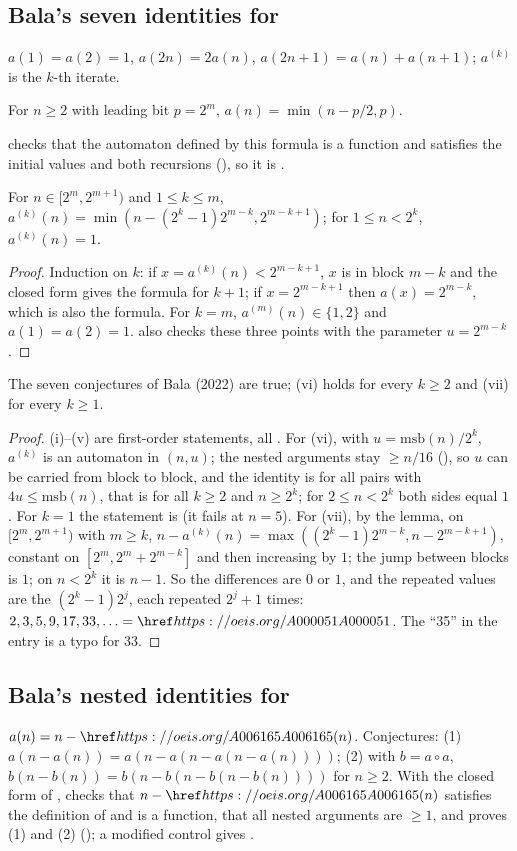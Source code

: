 \subsection{Bala's seven identities for }\label{s:A006165}
$a(1)=a(2)=1$, $a(2n)=2a(n)$, $a(2n+1)=a(n)+a(n+1)$; $a^{(k)}$ is the $k$-th iterate.
\begin{lemma} For $n\ge2$ with leading bit $p=2^m$, $a(n)=\min(n-p/2,p)$.\end{lemma}
\Walnut{} checks that the automaton defined by this formula is a function and satisfies the initial values
and both recursions (\TRUE), so it is .
\begin{lemma}[iterates] For $n\in[2^m,2^{m+1})$ and $1\le k\le m$,
$a^{(k)}(n)=\min(n-(2^k-1)2^{m-k},2^{m-k+1})$; for $1\le n<2^k$, $a^{(k)}(n)=1$.\end{lemma}
\begin{proof} Induction on $k$: if $x=a^{(k)}(n)<2^{m-k+1}$, $x$ is in block $m-k$ and the closed form gives the
formula for $k+1$; if $x=2^{m-k+1}$ then $a(x)=2^{m-k}$, which is also the formula. For $k=m$, $a^{(m)}(n)\in\{1,2\}$
and $a(1)=a(2)=1$. \Walnut{} also checks these three points with the parameter $u=2^{m-k}$. \end{proof}
\begin{theorem} The seven conjectures of Bala (2022) are true; (vi) holds for every $k\ge2$ and (vii) for
every $k\ge1$.\end{theorem}
\begin{proof} (i)--(v) are first-order statements, all \TRUE. For (vi), with $u=\mathrm{msb}(n)/2^k$, $a^{(k)}$ is an
automaton in $(n,u)$; the nested arguments stay $\ge n/16$ (\TRUE), so $u$ can be carried from block to block,
and the identity is \TRUE{} for all pairs with $4u\le\mathrm{msb}(n)$, that is for all $k\ge2$ and $n\ge2^k$; for
$2\le n<2^k$ both sides equal $1$. For $k=1$ the statement is \FALSE{} (it fails at $n=5$). For (vii), by the
lemma, on $[2^m,2^{m+1})$ with $m\ge k$, $n-a^{(k)}(n)=\max((2^k-1)2^{m-k},n-2^{m-k+1})$, constant on
$[2^m,2^m+2^{m-k}]$ and then increasing by $1$; the jump between blocks is $1$; on $n<2^k$ it is $n-1$. So the
differences are $0$ or $1$, and the repeated values are the $(2^k-1)2^j$, each repeated $2^j+1$ times:
$2,3,5,9,17,33,\ldots=\oeis{A000051}$. The ``35'' in the entry is a typo for $33$. \end{proof}

\subsection{Bala's nested identities for }\label{s:A060973}
$a(n)=n-\oeis{A006165}(n)$. Conjectures: (1) $a(n-a(n))=a(n-a(n-a(n-a(n))))$; (2) with $b=a\circ a$,
$b(n-b(n))=b(n-b(n-b(n-b(n))))$ for $n\ge2$. With the closed form of , \Walnut{} checks that
$n-\oeis{A006165}(n)$ satisfies the definition of  and is a function, that all nested arguments
are $\ge1$, and proves (1) and (2) (\TRUE); a modified control gives \FALSE.

